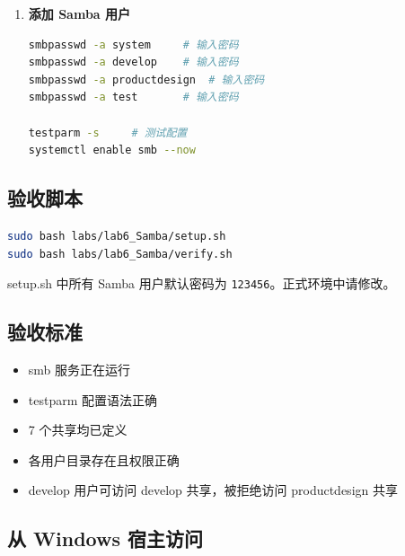 \documentclass[12pt,a4paper]{ctexart}
\begin{document}
\begin{enumerate}[label=\arabic*.,leftmargin=*]
\begin{cmdbox}
\begin{lstlisting}[language=bash]
[develop_test]
    path = /data/share/develop_test
    writeable = yes
    browseable = yes
    valid users = @develop,@test,@system
  \end{lstlisting}
  \end{cmdbox}

  \item \textbf{添加 Samba 用户}

  \begin{cmdbox}
  \begin{lstlisting}[language=bash]
smbpasswd -a system     # 输入密码
smbpasswd -a develop    # 输入密码
smbpasswd -a productdesign  # 输入密码
smbpasswd -a test       # 输入密码

testparm -s     # 测试配置
systemctl enable smb --now
  \end{lstlisting}
  \end{cmdbox}

\end{enumerate}

\subsection{验收脚本}

\begin{cmdbox}
\begin{lstlisting}[language=bash]
sudo bash labs/lab6_Samba/setup.sh
sudo bash labs/lab6_Samba/verify.sh
\end{lstlisting}
\end{cmdbox}

\begin{warnbox}
  setup.sh 中所有 Samba 用户默认密码为 \texttt{123456}。正式环境中请修改。
\end{warnbox}

\subsection{验收标准}

\begin{itemize}
  \item smb 服务正在运行
  \item testparm 配置语法正确
  \item 7 个共享均已定义
  \item 各用户目录存在且权限正确
  \item develop 用户可访问 develop 共享，被拒绝访问 productdesign 共享
\end{itemize}

\subsection{从 Windows 宿主访问}
\end{document}
